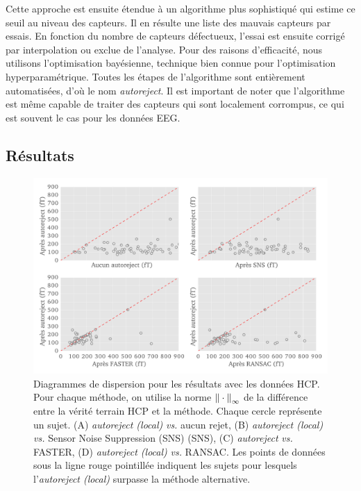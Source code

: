Cette approche est ensuite étendue à un algorithme plus sophistiqué qui estime ce seuil au niveau des capteurs. Il en résulte une liste des mauvais capteurs par essais. En fonction du nombre de capteurs défectueux, l'essai est ensuite corrigé par interpolation ou exclue de l'analyse. Pour des raisons d'efficacité, nous utilisons l'optimisation bayésienne, technique bien connue pour l'optimisation hyperparamétrique. Toutes les étapes de l'algorithme sont entièrement automatisées, d’où le nom \emph{autoreject}. Il est important de noter que l'algorithme est même capable de traiter des capteurs qui sont localement corrompus, ce qui est souvent le cas pour les données EEG.


\subsection*{Résultats}

\begin{figure}[htb]
    \centering
    \includegraphics[width=\linewidth]{figures/figure4_sommaire.pdf}
    \caption[]{Diagrammes de dispersion pour les résultats avec les données HCP. Pour chaque méthode, on utilise la norme ${\| \cdot \|}_{\mathrm{\infty}}$ de la différence entre la vérité terrain HCP et la méthode. Chaque cercle représente un sujet. (A) \textit{autoreject (local)} \emph{vs.} aucun rejet, (B) \textit{autoreject (local)} \emph{vs.} Sensor Noise Suppression (SNS) (SNS), (C) \textit{autoreject} \emph{vs.} FASTER, (D) \textit{autoreject (local)} \emph{vs.} RANSAC. Les points de données sous la ligne rouge pointillée indiquent les sujets pour lesquels l'\textit{autoreject (local)} surpasse la méthode alternative.}
    \label{fig:sommaire:hcp_scatter}
\end{figure}

